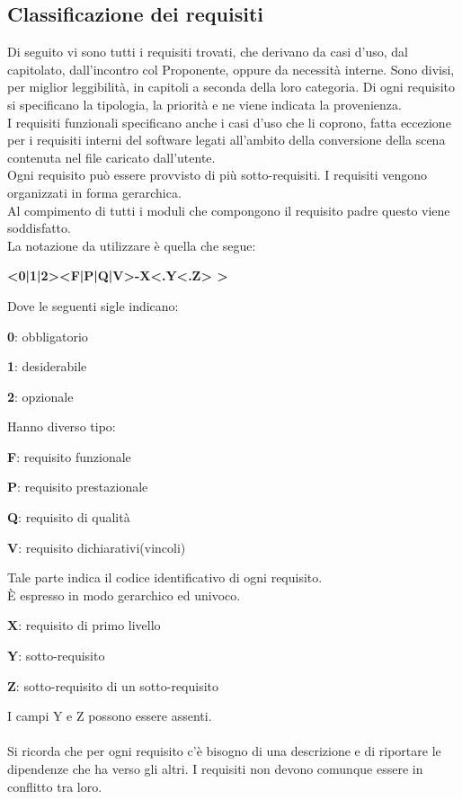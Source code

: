 \documentclass[12pt,a4paper,titlepage]{article}
\begin{document}
	\subsection{Classificazione dei requisiti}
	Di seguito vi sono tutti i requisiti trovati, che derivano da casi d'uso, dal capitolato, dall'incontro col Proponente, oppure da necessità interne. Sono divisi, per miglior leggibilità, in capitoli a seconda della loro categoria. Di ogni requisito si specificano la tipologia, la priorità e ne viene indicata la provenienza. \\
	I requisiti funzionali specificano anche i casi d'uso che li coprono, fatta eccezione per i requisiti interni del software legati all'ambito della conversione della scena contenuta nel file caricato dall'utente. \\
	Ogni requisito può essere provvisto di più sotto-requisiti. I requisiti vengono organizzati in forma gerarchica.\\
	Al compimento di tutti i moduli che compongono il requisito padre questo viene soddisfatto.\\
	La notazione da utilizzare è quella che segue:
	\begin{center}
		\textbf{ <0|1|2><F|P|Q|V>-X<.Y<.Z> > }
	\end{center}
	Dove le seguenti sigle indicano:
	\begin{trivlist}
		\item \textbf{0}: obbligatorio
		\item \textbf{1}: desiderabile
		\item \textbf{2}: opzionale
	\end{trivlist} 
	Hanno diverso tipo:
	\begin{trivlist}
		\item \textbf{F}: requisito funzionale
		\item \textbf{P}: requisito prestazionale
		\item \textbf{Q}: requisito di qualità
		\item \textbf{V}: requisito dichiarativi(vincoli)
	\end{trivlist} 
	Tale parte indica il codice identificativo di ogni requisito.\\
	È espresso in modo gerarchico ed univoco.
	\begin{trivlist}
		\item \textbf{X}: requisito di primo livello
		\item \textbf{Y}: sotto-requisito
		\item \textbf{Z}: sotto-requisito di un sotto-requisito
	\end{trivlist} 
	I campi Y e Z possono essere assenti.\\
	\\
	Si ricorda che per ogni requisito c'è bisogno di una descrizione e di riportare le dipendenze che ha verso gli altri. I requisiti non devono comunque essere in conflitto tra loro.
	\newpage
\end{document}
